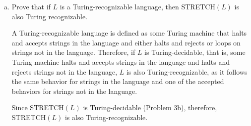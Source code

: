 \documentclass{article}
\begin{document}
\begin{enumerate}[(a)]
            If $L$ is a Turing-decidable language, that means some Turing machine $M$ decides $L$. Let another Turing machine $M'$ decide STRETCH$(L)$.

            $M' = $ ``On input string $v \in \text{STRETCH}(L)$,

            \begin{enumerate}[1.]
                \item Simulate $S$ (from Problem 3a) on $v$. If $S$ accepts, continue. Otherwise, if $S$ rejects, \textit{reject}.

                \item Move the tape left to the left end.

                \item Simulate $M$.
            \end{enumerate}

            Since the Turing machine $S$ from Problem 3a only accepts strings of the form STRETCH$(v)$ and converts the tape to $v$, any accepted stretched string will be converted to its pre-stretched form starting at the left end of the tape when $S$ accepts. Then, starting back from the left end, $M$ will decide on $v$. Since $S$ transmutes a stretched string into its original form, and $M$ can decide on the original string, STRETCH$(L)$ is Turing-decidable.

        \item Prove that if $L$ is a Turing-recognizable language, then STRETCH$(L)$ is also Turing recognizable.

            A Turing-recognizable language is defined as some Turing machine that halts and accepts strings in the language and either halts and rejects or loops on strings not in the language. Therefore, if $L$ is Turing-decidable, that is, some Turing machine halts and accepts strings in the language and halts and rejects strings not in the language, $L$ is also Turing-recognizable, as it follows the same behavior for strings in the language and one of the accepted behaviors for strings not in the language. 

            Since STRETCH$(L)$ is Turing-decidable (Problem 3b), therefore, STRETCH$(L)$ is also Turing-recognizable.
    \end{enumerate}

    
\end{document}

